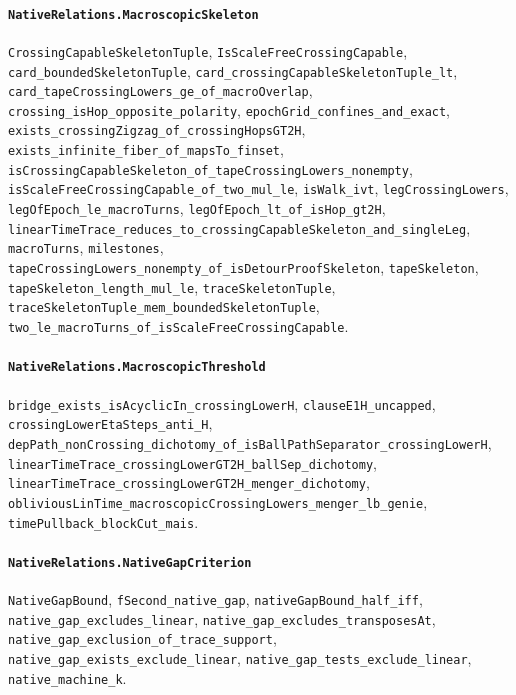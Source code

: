 \paragraph{\texttt{NativeRelations.MacroscopicSkeleton}}
{\small\raggedright \texttt{CrossingCapableSkeletonTuple}, \texttt{IsScaleFreeCrossingCapable}, \texttt{card\_boundedSkeletonTuple}, \texttt{card\_crossingCapableSkeletonTuple\_lt}, \texttt{card\_tapeCrossingLowers\_ge\_of\_macroOverlap}, \texttt{crossing\_isHop\_opposite\_polarity}, \texttt{epochGrid\_confines\_and\_exact}, \texttt{exists\_crossingZigzag\_of\_crossingHopsGT2H}, \texttt{exists\_infinite\_fiber\_of\_mapsTo\_finset}, \texttt{isCrossingCapableSkeleton\_of\_tapeCrossingLowers\_nonempty}, \texttt{isScaleFreeCrossingCapable\_of\_two\_mul\_le}, \texttt{isWalk\_ivt}, \texttt{legCrossingLowers}, \texttt{legOfEpoch\_le\_macroTurns}, \texttt{legOfEpoch\_lt\_of\_isHop\_gt2H}, \texttt{linearTimeTrace\_reduces\_to\_crossingCapableSkeleton\_and\_singleLeg}, \texttt{macroTurns}, \texttt{milestones}, \texttt{tapeCrossingLowers\_nonempty\_of\_isDetourProofSkeleton}, \texttt{tapeSkeleton}, \texttt{tapeSkeleton\_length\_mul\_le}, \texttt{traceSkeletonTuple}, \texttt{traceSkeletonTuple\_mem\_boundedSkeletonTuple}, \texttt{two\_le\_macroTurns\_of\_isScaleFreeCrossingCapable}.\par}

\paragraph{\texttt{NativeRelations.MacroscopicThreshold}}
{\small\raggedright \texttt{bridge\_exists\_isAcyclicIn\_crossingLowerH}, \texttt{clauseE1H\_uncapped}, \texttt{crossingLowerEtaSteps\_anti\_H}, \texttt{depPath\_nonCrossing\_dichotomy\_of\_isBallPathSeparator\_crossingLowerH}, \texttt{linearTimeTrace\_crossingLowerGT2H\_ballSep\_dichotomy}, \texttt{linearTimeTrace\_crossingLowerGT2H\_menger\_dichotomy}, \texttt{obliviousLinTime\_macroscopicCrossingLowers\_menger\_lb\_genie}, \texttt{timePullback\_blockCut\_mais}.\par}

\paragraph{\texttt{NativeRelations.NativeGapCriterion}}
{\small\raggedright \texttt{NativeGapBound}, \texttt{fSecond\_native\_gap}, \texttt{nativeGapBound\_half\_iff}, \texttt{native\_gap\_excludes\_linear}, \texttt{native\_gap\_excludes\_transposesAt}, \texttt{native\_gap\_exclusion\_of\_trace\_support}, \texttt{native\_gap\_exists\_exclude\_linear}, \texttt{native\_gap\_tests\_exclude\_linear}, \texttt{native\_machine\_k}.\par}

